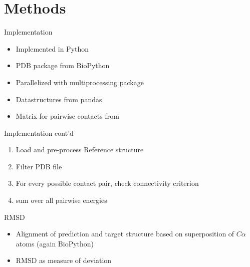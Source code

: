 \section{Methods}


\begin{frame}{Implementation}
	\begin{itemize}[<+->]
	    \item Implemented in Python
    	\item PDB package from BioPython \cite{pdb}
    	\item Parallelized with multiprocessing package
    	\item Datastructures from pandas
    	\item Matrix for pairwise contacts from \cite{Zhang1997}
	\end{itemize}
\end{frame}

\begin{frame}{Implementation cont'd}
	\begin{enumerate}[<+->]
		\item Load and pre-process Reference structure
	    \item Filter PDB file
	    \item For every possible contact pair, check connectivity criterion
	    \item sum over all pairwise energies
	\end{enumerate}
\end{frame}

\begin{frame}{RMSD}
	\begin{itemize}[<+->]
		\item Alignment of prediction and target structure based on superposition of $C\alpha$ atoms (again BioPython)
		\item RMSD as measure of deviation
		
	\end{itemize}
\end{frame}


